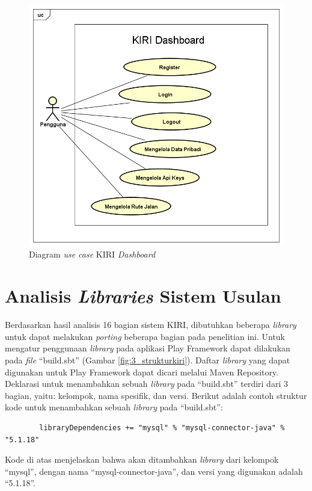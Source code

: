 \begin{figure}[htbp]
	\centering
		\includegraphics[scale=0.5]{Gambar/3_usecase.png}
	\caption{Diagram \textit{use case} KIRI \textit{Dashboard}}
	\label{fig:3_usecase}
\end{figure}

\section{Analisis \textit{Libraries} Sistem Usulan}
\label{sec:analisislibrary}
Berdasarkan hasil analisis 16 bagian sistem KIRI, dibutuhkan beberapa \textit{library} untuk dapat melakukan \textit{porting} beberapa bagian pada penelitian ini. Untuk mengatur penggunaan \textit{library} pada aplikasi Play Framework dapat dilakukan pada \textit{file} ``build.sbt''\cite{playframeworkweb} (Gambar \ref{fig:3_strukturkiri}). Daftar \textit{library} yang dapat digunakan untuk Play Framework dapat dicari melalui Maven Repository\cite{maven}. Deklarasi untuk menambahkan sebuah \textit{library} pada ``build.sbt'' terdiri dari 3 bagian, yaitu: kelompok, nama spesifik, dan versi. Berikut adalah contoh struktur kode untuk menambahkan sebuah \textit{library} pada ``build.sbt'':
\begin{lstlisting}
		libraryDependencies += "mysql" % "mysql-connector-java" % "5.1.18"
\end{lstlisting}
Kode di atas menjelaskan bahwa akan ditambahkan \textit{library} dari kelompok ``mysql'', dengan nama ``mysql-connector-java'', dan versi yang digunakan adalah ``5.1.18''.

